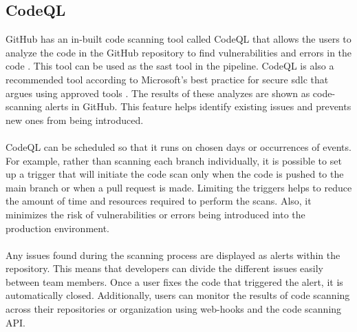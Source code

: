 \subsection{CodeQL}
GitHub has an in-built code scanning tool called CodeQL that allows the users to analyze the code in the GitHub repository to find vulnerabilities and errors in the code \cite{CodeQL1}. This tool can be used as the \acrshort{sast} tool in the \gls{pipeline}. CodeQL is also a recommended tool according to Microsoft's best practice for secure \acrshort{sdlc} that argues using approved tools \cite{microsoftSDLCpractices}. The results of these analyzes are shown as code-scanning alerts in GitHub. This feature helps identify existing issues and prevents new ones from being introduced. 
\\~\\
CodeQL can be scheduled so that it runs on chosen days or occurrences of events. For example, rather than scanning each branch individually, it is possible to set up a trigger that will initiate the code scan only when the code is pushed to the main branch or when a pull request is made. Limiting the triggers helps to reduce the amount of time and resources required to perform the scans. Also, it minimizes the risk of vulnerabilities or errors being introduced into the production environment.
\\~\\
Any issues found during the scanning process are displayed as alerts within the repository. This means that developers can divide the different issues easily between team members. Once a user fixes the code that triggered the alert, it is automatically closed. Additionally, users can monitor the results of code scanning across their repositories or organization using web-hooks and the code scanning API. 
\cite{GithubCodeScanning}


